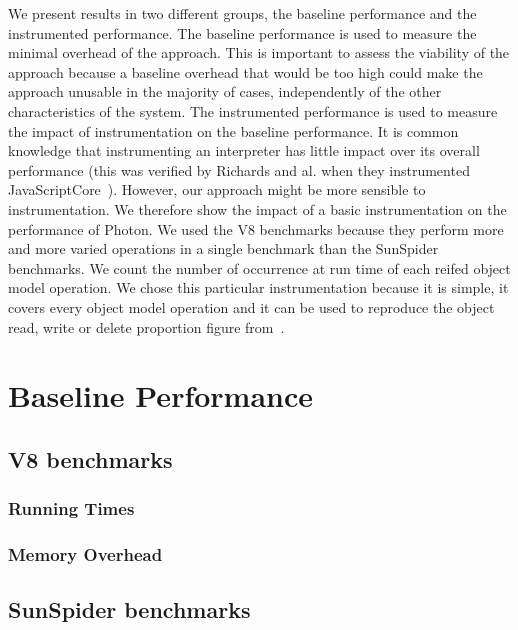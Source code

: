 We present results in two different groups, the baseline performance and the
instrumented performance.  The baseline performance is used to measure the
minimal overhead of the approach.  This is important to assess the viability of
the approach because a baseline overhead that would be too high could make the
approach unusable in the majority of cases, independently of the other
characteristics of the system. The instrumented performance is used to measure
the impact of instrumentation on the baseline performance. It is common
knowledge that instrumenting an interpreter has little impact over its overall
performance (this was verified by Richards and al. when they instrumented
JavaScriptCore~\cite{behavior_js}). However, our approach might be more
sensible to instrumentation. We therefore show the impact of a basic
instrumentation on the performance of Photon. We used the V8 benchmarks because
they perform more and more varied operations in a single benchmark than the
SunSpider benchmarks. We count the number of occurrence at run time of each
reifed object model operation. We chose this particular instrumentation because
it is simple, it covers every object model operation and it can be used to
reproduce the object read, write or delete proportion figure
from~\cite{behavior_js}.


\section{Baseline Performance}

\subsection{V8 benchmarks}

\subsubsection{Running Times}



\subsubsection{Memory Overhead}


\subsection{SunSpider benchmarks}

